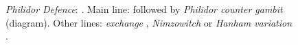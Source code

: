 \begin{figure}[H]
\begin{minipage}[b]{.246\linewidth}
\begin{framed}
\raggedright
\newgame
\emph{Philidor Defence}: .
Main line:  followed by \emph{Philidor counter gambit}  (diagram).
Other lines: \emph{exchange} , \emph{Nimzowitch}  or \emph{Hanham variation} .\begin{center}
\scalebox{.700}{\showboard}
\end{center}
\end{framed}
\end{minipage}
\end{figure}

